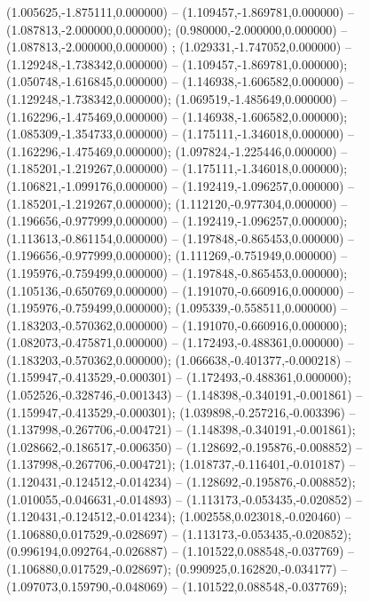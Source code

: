  (1.005625,-1.875111,0.000000) -- (1.109457,-1.869781,0.000000) -- (1.087813,-2.000000,0.000000);
 (0.980000,-2.000000,0.000000) -- (1.087813,-2.000000,0.000000) ;
 (1.029331,-1.747052,0.000000) -- (1.129248,-1.738342,0.000000) -- (1.109457,-1.869781,0.000000);
 (1.050748,-1.616845,0.000000) -- (1.146938,-1.606582,0.000000) -- (1.129248,-1.738342,0.000000);
 (1.069519,-1.485649,0.000000) -- (1.162296,-1.475469,0.000000) -- (1.146938,-1.606582,0.000000);
 (1.085309,-1.354733,0.000000) -- (1.175111,-1.346018,0.000000) -- (1.162296,-1.475469,0.000000);
 (1.097824,-1.225446,0.000000) -- (1.185201,-1.219267,0.000000) -- (1.175111,-1.346018,0.000000);
 (1.106821,-1.099176,0.000000) -- (1.192419,-1.096257,0.000000) -- (1.185201,-1.219267,0.000000);
 (1.112120,-0.977304,0.000000) -- (1.196656,-0.977999,0.000000) -- (1.192419,-1.096257,0.000000);
 (1.113613,-0.861154,0.000000) -- (1.197848,-0.865453,0.000000) -- (1.196656,-0.977999,0.000000);
 (1.111269,-0.751949,0.000000) -- (1.195976,-0.759499,0.000000) -- (1.197848,-0.865453,0.000000);
 (1.105136,-0.650769,0.000000) -- (1.191070,-0.660916,0.000000) -- (1.195976,-0.759499,0.000000);
 (1.095339,-0.558511,0.000000) -- (1.183203,-0.570362,0.000000) -- (1.191070,-0.660916,0.000000);
 (1.082073,-0.475871,0.000000) -- (1.172493,-0.488361,0.000000) -- (1.183203,-0.570362,0.000000);
 (1.066638,-0.401377,-0.000218) -- (1.159947,-0.413529,-0.000301) -- (1.172493,-0.488361,0.000000);
 (1.052526,-0.328746,-0.001343) -- (1.148398,-0.340191,-0.001861) -- (1.159947,-0.413529,-0.000301);
 (1.039898,-0.257216,-0.003396) -- (1.137998,-0.267706,-0.004721) -- (1.148398,-0.340191,-0.001861);
 (1.028662,-0.186517,-0.006350) -- (1.128692,-0.195876,-0.008852) -- (1.137998,-0.267706,-0.004721);
 (1.018737,-0.116401,-0.010187) -- (1.120431,-0.124512,-0.014234) -- (1.128692,-0.195876,-0.008852);
 (1.010055,-0.046631,-0.014893) -- (1.113173,-0.053435,-0.020852) -- (1.120431,-0.124512,-0.014234);
 (1.002558,0.023018,-0.020460) -- (1.106880,0.017529,-0.028697) -- (1.113173,-0.053435,-0.020852);
 (0.996194,0.092764,-0.026887) -- (1.101522,0.088548,-0.037769) -- (1.106880,0.017529,-0.028697);
 (0.990925,0.162820,-0.034177) -- (1.097073,0.159790,-0.048069) -- (1.101522,0.088548,-0.037769);
